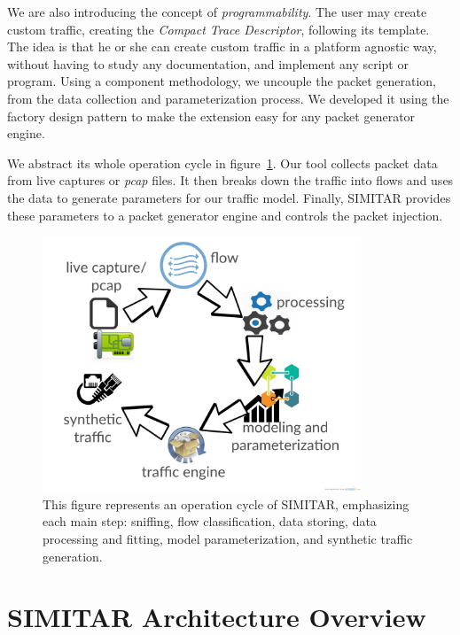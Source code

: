 We are also introducing the concept of \textit{programmability}. The user may create custom traffic, creating the \textit{Compact Trace Descriptor}, following its template. The idea is that he or she can create custom traffic in a platform agnostic way, without having to study any documentation, and implement any script or program.  Using a component methodology, we uncouple the packet generation, from the data collection and parameterization process. We developed it using the factory design pattern to make the extension easy for any packet generator engine. 

We abstract its whole operation cycle in figure~\ref{fig:cycle-of-operation}. Our tool collects packet data from live captures or \textit{pcap} files. It then breaks down the traffic into flows and uses the data to generate parameters for our traffic model. Finally, SIMITAR provides these parameters to a packet generator engine and controls the packet injection.

\begin{figure}[ht!]
        \centering
        \includegraphics[height=3.0in]{figures/ch3/digram-project-cycle}
        \caption{This figure represents an operation cycle of SIMITAR, emphasizing each main step: sniffing, flow classification, data storing, data processing and fitting, model parameterization,  and synthetic traffic generation.}
    \label{fig:cycle-of-operation}
\end{figure}

\section{SIMITAR Architecture Overview}


